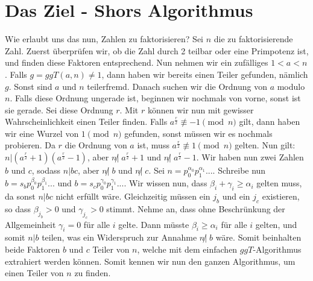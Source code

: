 \section{Das Ziel - Shors Algorithmus}
Wie erlaubt uns das nun, Zahlen zu faktorisieren? Sei $n$ die zu faktorisierende Zahl. Zuerst überprüfen wir, ob die Zahl durch 2 teilbar oder eine Primpotenz ist, und finden diese Faktoren entsprechend. Nun nehmen wir ein zufälliges $1 < a < n$. Falls $g = ggT(a, n) \neq 1$, dann haben wir bereits einen Teiler gefunden, nämlich $g$. Sonst sind $a$ und $n$ teilerfremd. Danach suchen wir die Ordnung von $a$ modulo $n$. Falls diese Ordnung ungerade ist, beginnen wir nochmals von vorne, sonst ist sie gerade. Sei diese Ordnung $r$. Mit $r$ können wir nun mit gewisser Wahrscheinlichkeit einen Teiler finden. Falls $a^{\frac{r}{2}} \not\equiv -1 \pmod n$ gilt, dann haben wir eine Wurzel von $1 \pmod{n}$ gefunden, sonst müssen wir es nochmals probieren. Da $r$ die Ordnung von $a$ ist, muss $a^{\frac{r}{2}}\not\equiv 1 \pmod{n}$ gelten. Nun gilt: $n | (a^\frac{r}{2} + 1)(a^\frac{r}{2} - 1)$, aber $n \not| \; a^\frac{r}{2} + 1$ und $n \not| \; a^\frac{r}{2} - 1$. Wir haben nun zwei Zahlen $b$ und $c$, sodass $n | bc$, aber $n \not | \; b$ und $n \not | \; c$. Sei $n = p_0^{\alpha_0}p_1^{\alpha_1}...$. Schreibe nun $b = s_bp_0^{\beta_0}p_1^{\beta_1}...$ und $b = s_cp_0^{\gamma_0}p_1^{\gamma_1}...$. Wir wissen nun, dass $\beta_i + \gamma_i \geq \alpha_i$ gelten muss, da sonst $n | bc$ nicht erfüllt wäre. Gleichzeitig müssen ein $j_b$ und ein $j_c$ existieren, so dass $\beta_{j_b} > 0$ und $\gamma_{j_c} > 0$ stimmt. Nehme an, dass ohne Beschrünkung der Allgemeinheit $\gamma_i = 0$ für alle $i$ gelte. Dann müsste $\beta_i \geq \alpha_i$ für alle $i$ gelten, und somit $n | b$ teilen, was ein Widerspruch zur Annahme $n \not | \; b$ wäre. Somit beinhalten beide Faktoren $b$ und $c$ Teiler von $n$, welche mit dem einfachen $ggT$-Algorithmus extrahiert werden können. Somit kennen wir nun den ganzen Algorithmus, um einen Teiler von $n$ zu finden.
